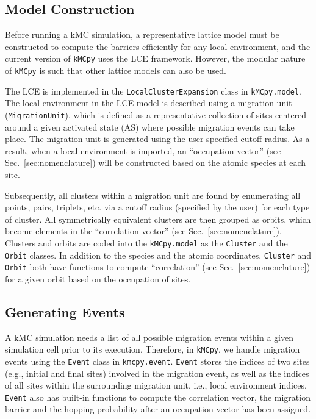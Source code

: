 \documentclass[a4paper,fleqn]{cas-dc}
\begin{document}
{\subsection{Model Construction}\label{sec:model}
\noindent Before running a kMC simulation, a representative lattice model must be constructed to compute the barriers efficiently for any local environment, and the current version of \texttt{kMCpy} uses the LCE framework. However, the modular nature of \texttt{kMCpy} is such that other lattice models can also be used.

The LCE is implemented in the \texttt{LocalClusterExpansion} class in \texttt{\texttt{kMCpy}.model}. The local environment in the LCE model is described using a migration unit (\texttt{MigrationUnit}), which is defined as a representative collection of sites  centered around a given activated state (AS) where possible migration events can take place. The migration unit is generated using the user-specified cutoff radius. As a result, when a local environment is imported, an ``occupation vector'' (see Sec.~{\ref{sec:nomenclature}}) will be constructed based on the atomic species at each site.

Subsequently, all clusters within a migration unit are found by enumerating all points, pairs, triplets, etc.  via a cutoff radius (specified by the user) for each type of cluster.  All symmetrically equivalent clusters are then grouped as orbits, which become elements in the ``correlation vector'' (see Sec.~\ref{sec:nomenclature}). Clusters and orbits are coded into the \texttt{kMCpy.model} as the \texttt{Cluster} and the \texttt{Orbit} classes. In addition to the species and the atomic coordinates, \texttt{Cluster} and \texttt{Orbit} both have functions to compute ``correlation'' (see Sec.~\ref{sec:nomenclature}) for a given orbit based on the occupation of sites.

\subsection{Generating Events}\label{sec:events}
\noindent A kMC simulation needs a list of all possible migration events within a given simulation cell prior to its execution. Therefore, in \texttt{kMCpy}, we handle migration events using the \texttt{Event} class in \texttt{kmcpy.event}. \texttt{Event} stores the indices of two  sites (e.g., initial and final sites) involved in the migration event, as well as the indices of all sites within the surrounding migration unit, i.e., local environment indices. \texttt{Event} also has built-in functions to compute the correlation vector, the migration barrier and the hopping probability after an occupation vector has been assigned.

}
\end{document}
